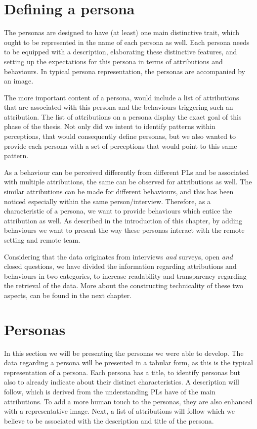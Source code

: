 \section{Defining a persona} \label{DefiningAPersona}

The personas are designed to have (at least) one main distinctive trait, which ought to be represented in the name of each persona as well. Each persona needs to be equipped with a description, elaborating these distinctive features, and setting up the expectations for this persona in terms of attributions and behaviours. In typical persona representation, the personas are accompanied by an image.

The more important content of a persona, would include a list of attributions that are associated with this persona and the behaviours triggering such an attribution. The list of attributions on a persona display the exact goal of this phase of the thesis. Not only did we intent to identify patterns within perceptions, that would consequently define personas, but we also wanted to provide each persona with a set of perceptions that would point to this same pattern.

As a behaviour can be perceived differently from different PLs and be associated with multiple attributions, the same can be observed for attributions as well. The similar attributions can be made for different behaviours, and this has been noticed especially within the same person/interview. Therefore, as a characteristic of a persona, we want to provide behaviours which entice the attribution as well. As described in the introduction of this chapter, by adding behaviours we want to present the way these personas interact with the remote setting and remote team.

Considering that the data originates from interviews \textit{and} surveys, open \textit{and} closed questions, we have divided the information regarding attributions and behaviours in two categories, to increase readability and transparency regarding the retrieval of the data. More about the constructing technicality of these two aspects, can be found in the next chapter.


\section{Personas} 

In this section we will be presenting the personas we were able to develop. The data regarding a persona will be presented in a tabular form, as this is the typical representation of a persona. Each persona has a title, to identify personas but also to already indicate about their distinct characteristics. A description will follow, which is derived from the understanding PLs have of the main attributions. To add a more human touch to the personas, they are also enhanced with a representative image. Next, a list of attributions will follow which we believe to be associated with the description and title of the persona. 

